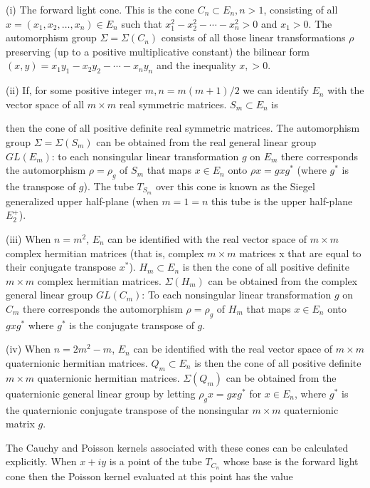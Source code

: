(i) The forward light cone. This is the cone $C_n \subset E_n, n > 1$, consisting of all $x = (x_1, x_2, \ldots, x_n) \in E_n$ such that $x_1^2 - x_2^2 - \cdots - x_n^2 > 0$ and $x_1 > 0$. The automorphism group $\Sigma = \Sigma(C_n)$ consists of all those linear transformations $\rho$ preserving (up to a positive multiplicative constant) the bilinear form $(x, y) = x_1 y_1 - x_2 y_2 - \cdots - x_n y_n$ and the inequality $x, > 0$.

(ii) If, for some positive integer $m, n = m(m + 1)/2$ we can identify $E_n$ with the vector space of all $m \times m$ real symmetric matrices. $S_m \subset E_n$ is

then the cone of all positive definite real symmetric matrices. The automorphism group $\Sigma = \Sigma(S_m)$ can be obtained from the real general linear group $GL(E_m)$: to each nonsingular linear transformation $g$ on $E_m$ there corresponds the automorphism $\rho = \rho_g$ of $S_m$ that maps $x \in E_n$ onto $\rho x = g x g^*$ (where $g^*$ is the transpose of $g$). The tube $T_{S_m}$ over this cone is known as the Siegel generalized upper half-plane (when $m = 1 = n$ this tube is the upper half-plane $E_2^+$).

(iii) When $n = m^2$, $E_n$ can be identified with the real vector space of $m \times m$ complex hermitian matrices (that is, complex $m \times m$ matrices x that are equal to their conjugate transpose $x^*$). $H_m \subset E_n$ is then the cone of all positive definite $m \times m$ complex hermitian matrices. $\Sigma(H_m)$ can be obtained from the complex general linear group $GL(C_m)$: To each nonsingular linear transformation $g$ on $C_m$ there corresponds the automorphism $\rho = \rho_g$ of $H_m$ that maps $x \in E_n$ onto $gxg^*$ where $g^*$ is the conjugate transpose of $g$.

(iv) When $n = 2m^2 - m$, $E_n$ can be identified with the real vector space of $m \times m$ quaternionic hermitian matrices. $Q_m \subset E_n$ is then the cone of all positive definite $m \times m$ quaternionic hermitian matrices. $\Sigma(Q_m)$ can be obtained from the quaternionic general linear group by letting $\rho_g x = g x g^*$ for $x \in E_n$, where $g^*$ is the quaternionic conjugate transpose of the nonsingular $m \times m$ quaternionic matrix $g$.

The Cauchy and Poisson kernels associated with these cones can be calculated explicitly. When $x + iy$ is a point of the tube $T_{C_n}$ whose base is the forward light cone then the Poisson kernel evaluated at this point has the value

